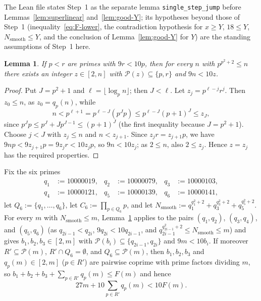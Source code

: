 \documentclass[11pt,a4paper]{amsart}
\newtheorem{lemma}{Lemma}
\newcommand{\Nsmooth}{N_{\mathrm{smooth}}}
\begin{document}
\endgroup
The Lean file states Step~1 as the separate lemma \texttt{single\_step\_jump} before Lemmas~\ref{lem:superlinear} and~\ref{lem:good-Y}; its hypotheses beyond those of Step~1 (inequality~\eqref{eq:F-lower}, the contradiction hypothesis for $x \ge Y$, $18 \le Y$, $\Nsmooth \le Y$, and the conclusion of Lemma~\ref{lem:good-Y} for $Y$) are the standing assumptions of Step~1 here.

\begin{lemma}\label{lem:smooth}
If $p < r$ are primes with $9 r < 10 p$, then for every $n$ with $p^{p^2 + 2} \le n$ there exists an integer $z \in [2, n]$ with $\mathcal{P}(z) \subseteq \{p, r\}$ and $9 n < 10 z$.
\end{lemma}

\begin{proof}
Put $J = p^2 + 1$ and $\ell = \lfloor \log_p n \rfloor$; then $J < \ell$. Let $z_j = p^{\ell - j} r^j$. Then $z_0 \le n$, as $z_0 = q_p(n)$, while
\[
n < p^{\ell + 1} = p^{\ell - J} (p^J p) \le p^{\ell - J} (p + 1)^J \le z_J,
\]
since $p^J p \le p^J + J p^{J - 1} \le (p + 1)^J$ (the first inequality because $J = p^2 + 1$). Choose $j < J$ with $z_j \le n$ and $n < z_{j + 1}$. Since $z_j r = z_{j + 1} p$, we have $9 n p < 9 z_{j + 1} p = 9 z_j r < 10 z_j p$, so $9 n < 10 z_j$; as $2 \le n$, also $2 \le z_j$. Hence $z = z_j$ has the required properties.
\end{proof}

Fix the six primes
\[
\begin{aligned}
q_1 &:= 10000019, & q_2 &:= 10000079, & q_3 &:= 10000103, \\
q_4 &:= 10000121, & q_5 &:= 10000139, & q_6 &:= 10000141,
\end{aligned}
\]
let $Q_6 := \{q_1, \dots, q_6\}$, let $C_6 := \prod_{p \in Q_6} p$, and let $\Nsmooth := q_1^{q_1^2 + 2} + q_3^{q_3^2 + 2} + q_5^{q_5^2 + 2}$. For every $m$ with $\Nsmooth \le m$, Lemma~\ref{lem:smooth} applies to the pairs $(q_1, q_2)$, $(q_3, q_4)$, and $(q_5, q_6)$ (as $q_{2i-1} < q_{2i}$, $9 q_{2i} < 10 q_{2i-1}$, and $q_{2i-1}^{q_{2i-1}^2 + 2} \le \Nsmooth \le m$) and gives $b_1, b_2, b_3 \in [2, m]$ with $\mathcal{P}(b_i) \subseteq \{q_{2i-1}, q_{2i}\}$ and $9 m < 10 b_i$. If moreover $R' \subseteq \mathcal{P}(m)$, $R' \cap Q_6 = \emptyset$, and $Q_6 \subseteq \mathcal{P}(m)$, then $b_1, b_2, b_3$ and $q_p(m) \in [2, m]$ ($p \in R'$) are pairwise coprime with prime factors dividing $m$, so $b_1 + b_2 + b_3 + \sum_{p \in R'} q_p(m) \le F(m)$ and hence
\begin{equation}\label{eq:F-lower}
27 m + 10 \sum_{p \in R'} q_p(m) < 10 F(m).
\end{equation}
\end{document}
